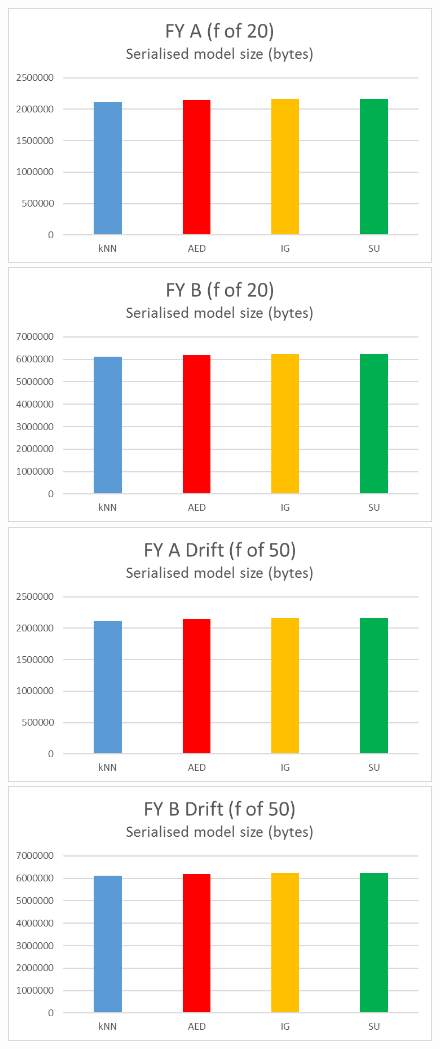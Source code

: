 \begin{figure}[hp]
\includegraphics[scale=0.17]{Graphs/FY_A/bytes20}
\includegraphics[scale=0.17]{Graphs/FY_B/bytes20}
\includegraphics[scale=0.17]{Graphs/FY_A_Drift/bytes}
\includegraphics[scale=0.17]{Graphs/FY_B_Drift/bytes}

\end{figure}
